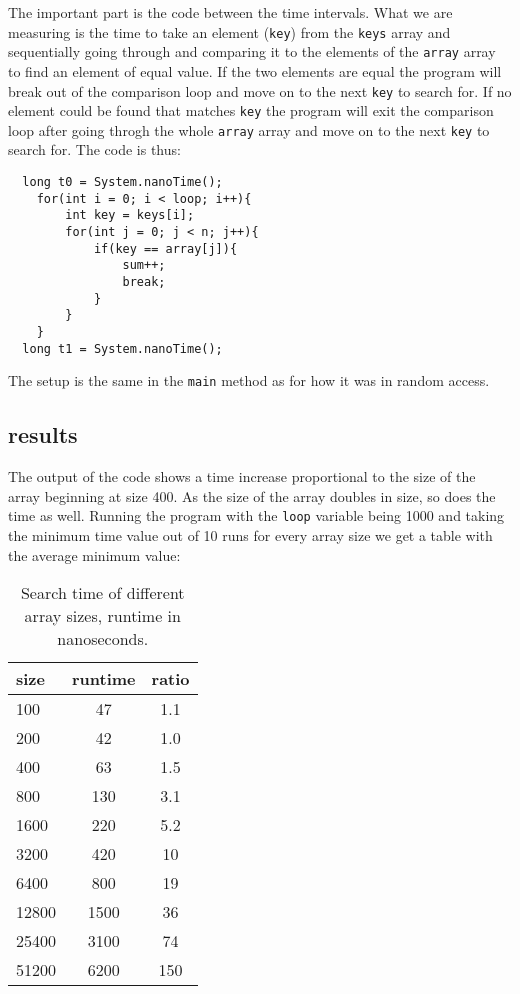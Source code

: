 \documentclass[a4paper,11pt]{article}
\begin{document}
The important part is the code between the time intervals. What we are
measuring is the time to take an element ({\tt key}) from the {\tt keys}
array and sequentially going through and comparing it to the elements
of the {\tt array} array to find an element of equal value. If the two
elements are equal the program will break out of the comparison loop
and move on to the next {\tt key} to search for. If no element could be
found that matches {\tt key} the program will exit the comparison loop
after going throgh the whole {\tt array} array and move on to the next
{\tt key} to search for. The code is thus:

\begin{verbatim}
  long t0 = System.nanoTime();
    for(int i = 0; i < loop; i++){
        int key = keys[i];
        for(int j = 0; j < n; j++){
            if(key == array[j]){
                sum++;
                break;
            }
        }
    }
  long t1 = System.nanoTime();
\end{verbatim}

The setup is the same in the {\tt main} method as for how it was in
random access.

\subsection*{results}

The output of the code shows a time increase proportional to the size of
the array beginning at size 400. As the size of the array doubles in
size, so does the time as well. Running the program with the {\tt loop} 
variable being 1000 and taking the minimum time value out of 10 runs for 
every array size we get a table with the average minimum value:

\begin{table}[h]
  \begin{center}
  \begin{tabular}{l|c|c}
  \textbf{size} & \textbf{runtime} & \textbf{ratio}\\
  \hline
    100      & 47   &     1.1\\
    200      & 42   &     1.0\\
    400      & 63   &     1.5\\
    800      & 130  &     3.1\\
    1600     & 220  &     5.2\\
    3200     & 420  &     10\\
    6400     & 800  &     19\\
    12800    & 1500 &     36\\
    25400    & 3100 &     74\\
    51200    & 6200 &     150\\ 
  \end{tabular}
  \caption{Search time of different array sizes, runtime in nanoseconds.}
  \label{tab:table2}
  \end{center}
  \end{table}
\end{document}
